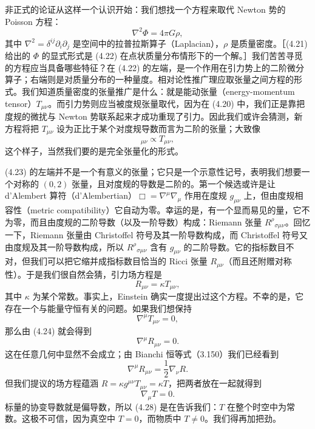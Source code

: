 非正式的论证从这样一个认识开始：我们想找一个方程来取代 Newton 势的 Poisson 方程：
\begin{equation*}
\nabla^2\Phi = 4\pi G\rho,
\tag{4.22}
\end{equation*}
其中 $\nabla^2=\delta^{ij}\partial_i\partial_j$ 是空间中的拉普拉斯算子（Laplacian），$\rho$ 是质量密度。［(4.21) 给出的 $\Phi$ 的显式形式是 (4.22) 在点状质量分布情形下的一个解。］我们苦苦寻觅的方程应当具备哪些特征？在 (4.22) 的左端，是一个作用在引力势上的二阶微分算子；右端则是对质量分布的一种量度。相对论性推广理应取张量之间方程的形式。我们知道质量密度的张量推广是什么：就是能动张量（energy-momentum tensor）$T_{\mu\nu}$。而引力势则应当被度规张量取代，因为在 (4.20) 中，我们正是靠把度规的微扰与 Newton 势联系起来才成功重现了引力。因此我们或许会猜测，新方程将把 $T_{\mu\nu}$ 设为正比于某个对度规导数而言为二阶的张量；大致像
\begin{equation*}
[\nabla^2 g]_{\mu\nu} \propto T_{\mu\nu},
\tag{4.23}
\end{equation*}
这个样子，当然我们要的是完全张量化的形式。

(4.23) 的左端并不是一个有意义的张量；它只是一个示意性记号，表明我们想要一个对称的 $(0,2)$ 张量，且对度规的导数是二阶的。第一个候选或许是让 d'Alembert 算符（d'Alembertian）$\Box=\nabla^\mu\nabla_\mu$ 作用在度规 $g_{\mu\nu}$ 上，但由度规相容性（metric compatibility）它自动为零。幸运的是，有一个显而易见的量，它不为零，而且由度规的二阶导数（以及一阶导数）构成：Riemann 张量 $R^\rho{}_{\sigma\mu\nu}$。回忆一下，Riemann 张量由 Christoffel 符号及其一阶导数构成，而 Christoffel 符号又由度规及其一阶导数构成，所以 $R^\rho{}_{\sigma\mu\nu}$ 含有 $g_{\mu\nu}$ 的二阶导数。它的指标数目不对，但我们可以把它缩并成指标数目恰当的 Ricci 张量 $R_{\mu\nu}$（而且还附赠对称性）。于是我们很自然会猜，引力场方程是
\begin{equation*}
R_{\mu\nu} = \kappa T_{\mu\nu},
\tag{4.24}
\end{equation*}
其中 $\kappa$ 为某个常数。事实上，Einstein 确实一度提出过这个方程。不幸的是，它存在一个与能量守恒有关的问题。如果我们想保持
\begin{equation*}
\nabla^\mu T_{\mu\nu} = 0,
\tag{4.25}
\end{equation*}
那么由 (4.24) 就会得到
\begin{equation*}
\nabla^\mu R_{\mu\nu} = 0.
\tag{4.26}
\end{equation*}
这在任意几何中显然不会成立；由 Bianchi 恒等式（3.150）我们已经看到
\begin{equation*}
\nabla^\mu R_{\mu\nu} = \frac{1}{2}\nabla_\nu R.
\tag{4.27}
\end{equation*}
但我们提议的场方程蕴涵 $R=\kappa g^{\mu\nu}T_{\mu\nu}=\kappa T$，把两者放在一起就得到
\begin{equation*}
\nabla_\mu T = 0.
\tag{4.28}
\end{equation*}
标量的协变导数就是偏导数，所以 (4.28) 是在告诉我们：$T$ 在整个时空中为常数。这极不可信，因为真空中 $T=0$，而物质中 $T\neq 0$。我们得再加把劲。

